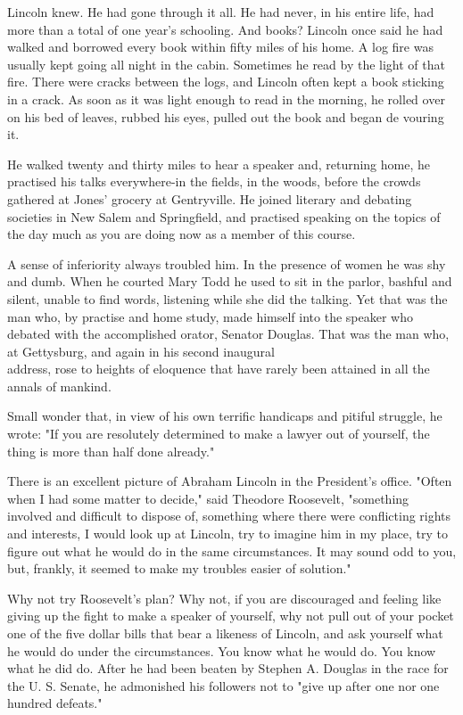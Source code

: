 \documentclass[10pt]{article}
\begin{document}
Lincoln knew. He had gone through it all. He had never, in his entire life, had more than a total of one year's schooling. And books? Lincoln once said he had walked and borrowed every book within fifty miles of his home. A log fire was usually kept going all night in the cabin. Sometimes he read by the light of that fire. There were cracks between the logs, and Lincoln often kept a book sticking in a crack. As soon as it was light enough to read in the morning, he rolled over on his bed of leaves, rubbed his eyes, pulled out the book and began de vouring it.

He walked twenty and thirty miles to hear a speaker and, returning home, he practised his talks everywhere-in the fields, in the woods, before the crowds gathered at Jones' grocery at Gentryville. He joined literary and debating societies in New Salem and Springfield, and practised speaking on the topics of the day much as you are doing now as a member of this course.

A sense of inferiority always troubled him. In the presence of women he was shy and dumb. When he courted Mary Todd he used to sit in the parlor, bashful and silent, unable to find words, listening while she did the talking. Yet that was the man who, by practise and home study, made himself into the speaker who debated with the accomplished orator, Senator Douglas. That was the man who, at Gettysburg, and again in his second inaugural\\
address, rose to heights of eloquence that have rarely been attained in all the annals of mankind.

Small wonder that, in view of his own terrific handicaps and pitiful struggle, he wrote: "If you are resolutely determined to make a lawyer out of yourself, the thing is more than half done already."

There is an excellent picture of Abraham Lincoln in the President's office. "Often when I had some matter to decide," said Theodore Roosevelt, "something involved and difficult to dispose of, something where there were conflicting rights and interests, I would look up at Lincoln, try to imagine him in my place, try to figure out what he would do in the same circumstances. It may sound odd to you, but, frankly, it seemed to make my troubles easier of solution."

Why not try Roosevelt's plan? Why not, if you are discouraged and feeling like giving up the fight to make a speaker of yourself, why not pull out of your pocket one of the five dollar bills that bear a likeness of Lincoln, and ask yourself what he would do under the circumstances. You know what he would do. You know what he did do. After he had been beaten by Stephen A. Douglas in the race for the U. S. Senate, he admonished his followers not to "give up after one nor one hundred defeats."
\end{document}
